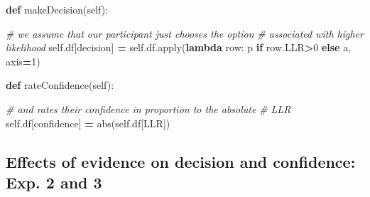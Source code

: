 \documentclass[12pt,twoside]{reedthesis}
\newenvironment{Shaded}{\begin{snugshade}}{\end{snugshade}}
\newcommand{\BuiltInTok}[1]{#1}
\newcommand{\CommentTok}[1]{\textcolor[rgb]{0.56,0.35,0.01}{\textit{#1}}}
\newcommand{\ControlFlowTok}[1]{\textcolor[rgb]{0.13,0.29,0.53}{\textbf{#1}}}
\newcommand{\DecValTok}[1]{\textcolor[rgb]{0.00,0.00,0.81}{#1}}
\newcommand{\KeywordTok}[1]{\textcolor[rgb]{0.13,0.29,0.53}{\textbf{#1}}}
\newcommand{\NormalTok}[1]{#1}
\newcommand{\OperatorTok}[1]{\textcolor[rgb]{0.81,0.36,0.00}{\textbf{#1}}}
\newcommand{\StringTok}[1]{\textcolor[rgb]{0.31,0.60,0.02}{#1}}
\newcommand{\VariableTok}[1]{\textcolor[rgb]{0.00,0.00,0.00}{#1}}
\begin{document}
\begin{Shaded}
\begin{Highlighting}[]
    \KeywordTok{def}\NormalTok{ makeDecision(}\VariableTok{self}\NormalTok{):}
        
        \CommentTok{\# we assume that our participant just chooses the option }
        \CommentTok{\# associated with higher likelihood}
        \VariableTok{self}\NormalTok{.df[}\StringTok{\textquotesingle{}decision\textquotesingle{}}\NormalTok{] }\OperatorTok{=}  \VariableTok{self}\NormalTok{.df.}\BuiltInTok{apply}\NormalTok{(}\KeywordTok{lambda}\NormalTok{ row: }
               \StringTok{\textquotesingle{}p\textquotesingle{}} \ControlFlowTok{if}\NormalTok{ row.LLR}\OperatorTok{\textgreater{}}\DecValTok{0} 
                \ControlFlowTok{else} \StringTok{\textquotesingle{}a\textquotesingle{}}\NormalTok{, }
\NormalTok{                axis}\OperatorTok{=}\DecValTok{1}\NormalTok{)}
        
    \KeywordTok{def}\NormalTok{ rateConfidence(}\VariableTok{self}\NormalTok{):}
        
        \CommentTok{\# and rates their confidence in proportion to the absolute}
        \CommentTok{\# LLR}
        \VariableTok{self}\NormalTok{.df[}\StringTok{\textquotesingle{}confidence\textquotesingle{}}\NormalTok{] }\OperatorTok{=} \BuiltInTok{abs}\NormalTok{(}\VariableTok{self}\NormalTok{.df[}\StringTok{\textquotesingle{}LLR\textquotesingle{}}\NormalTok{])}
\end{Highlighting}
\end{Shaded}
\hypertarget{effects-of-evidence-on-decision-and-confidence-exp.-2-and-3}{%
\subsection{Effects of evidence on decision and confidence: Exp. 2 and 3}\label{effects-of-evidence-on-decision-and-confidence-exp.-2-and-3}}
\end{document}
